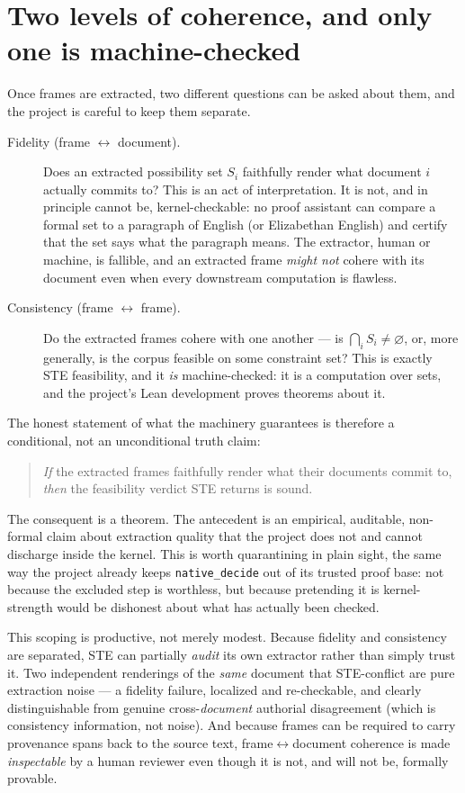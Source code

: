 \documentclass[11pt]{article}
\newcommand{\code}[1]{\texttt{#1}}
\begin{document}
\section{Two levels of coherence, and only one is machine-checked}
\label{sec:twolevel}

Once frames are extracted, two different questions can be asked about
them, and the project is careful to keep them separate.

\begin{description}
\item[Fidelity (frame $\leftrightarrow$ document).] Does an extracted
  possibility set $S_i$ faithfully render what document $i$ actually
  commits to? This is an act of interpretation. It is not, and in
  principle cannot be, kernel-checkable: no proof assistant can compare
  a formal set to a paragraph of English (or Elizabethan English) and
  certify that the set says what the paragraph means. The extractor,
  human or machine, is fallible, and an extracted frame \emph{might not}
  cohere with its document even when every downstream computation is
  flawless.
\item[Consistency (frame $\leftrightarrow$ frame).] Do the extracted
  frames cohere with one another --- is $\bigcap_i S_i \ne
  \varnothing$, or, more generally, is the corpus feasible on some
  constraint set? This is exactly STE feasibility, and it \emph{is}
  machine-checked: it is a computation over sets, and the project's
  Lean development proves theorems about it.
\end{description}

The honest statement of what the machinery guarantees is therefore a
conditional, not an unconditional truth claim:
\begin{quote}
\emph{If} the extracted frames faithfully render what their documents
commit to, \emph{then} the feasibility verdict STE returns is sound.
\end{quote}
The consequent is a theorem. The antecedent is an empirical, auditable,
non-formal claim about extraction quality that the project does not
and cannot discharge inside the kernel. This is worth quarantining in
plain sight, the same way the project already keeps
\code{native\_decide} out of its trusted proof base: not because the
excluded step is worthless, but because pretending it is
kernel-strength would be dishonest about what has actually been
checked.

This scoping is productive, not merely modest. Because fidelity and
consistency are separated, STE can partially \emph{audit} its own
extractor rather than simply trust it. Two independent renderings of
the \emph{same} document that STE-conflict are pure extraction noise
--- a fidelity failure, localized and re-checkable, and clearly
distinguishable from genuine cross-\emph{document} authorial
disagreement (which is consistency information, not noise). And
because frames can be required to carry provenance spans back to the
source text, frame$\leftrightarrow$document coherence is made
\emph{inspectable} by a human reviewer even though it is not, and will
not be, formally provable.
\end{document}
